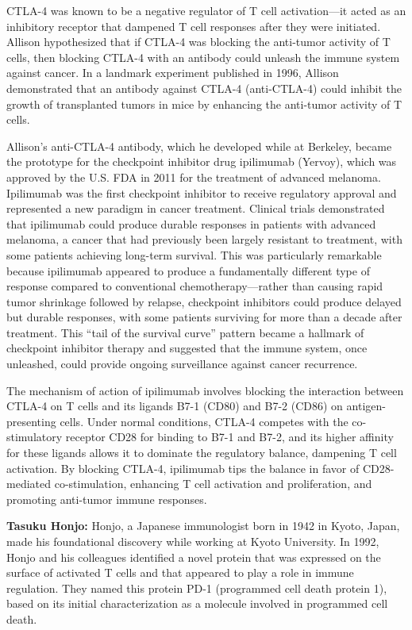 CTLA-4 was known to be a negative regulator of T cell activation---it acted as an inhibitory receptor that dampened T cell responses after they were initiated. Allison hypothesized that if CTLA-4 was blocking the anti-tumor activity of T cells, then blocking CTLA-4 with an antibody could unleash the immune system against cancer. In a landmark experiment published in 1996, Allison demonstrated that an antibody against CTLA-4 (anti-CTLA-4) could inhibit the growth of transplanted tumors in mice by enhancing the anti-tumor activity of T cells.

Allison's anti-CTLA-4 antibody, which he developed while at Berkeley, became the prototype for the checkpoint inhibitor drug ipilimumab (Yervoy), which was approved by the U.S. FDA in 2011 for the treatment of advanced melanoma. Ipilimumab was the first checkpoint inhibitor to receive regulatory approval and represented a new paradigm in cancer treatment. Clinical trials demonstrated that ipilimumab could produce durable responses in patients with advanced melanoma, a cancer that had previously been largely resistant to treatment, with some patients achieving long-term survival. This was particularly remarkable because ipilimumab appeared to produce a fundamentally different type of response compared to conventional chemotherapy---rather than causing rapid tumor shrinkage followed by relapse, checkpoint inhibitors could produce delayed but durable responses, with some patients surviving for more than a decade after treatment. This ``tail of the survival curve'' pattern became a hallmark of checkpoint inhibitor therapy and suggested that the immune system, once unleashed, could provide ongoing surveillance against cancer recurrence.

The mechanism of action of ipilimumab involves blocking the interaction between CTLA-4 on T cells and its ligands B7-1 (CD80) and B7-2 (CD86) on antigen-presenting cells. Under normal conditions, CTLA-4 competes with the co-stimulatory receptor CD28 for binding to B7-1 and B7-2, and its higher affinity for these ligands allows it to dominate the regulatory balance, dampening T cell activation. By blocking CTLA-4, ipilimumab tips the balance in favor of CD28-mediated co-stimulation, enhancing T cell activation and proliferation, and promoting anti-tumor immune responses.

\textbf{Tasuku Honjo:} Honjo, a Japanese immunologist born in 1942 in Kyoto, Japan, made his foundational discovery while working at Kyoto University. In 1992, Honjo and his colleagues identified a novel protein that was expressed on the surface of activated T cells and that appeared to play a role in immune regulation. They named this protein PD-1 (programmed cell death protein 1), based on its initial characterization as a molecule involved in programmed cell death.

